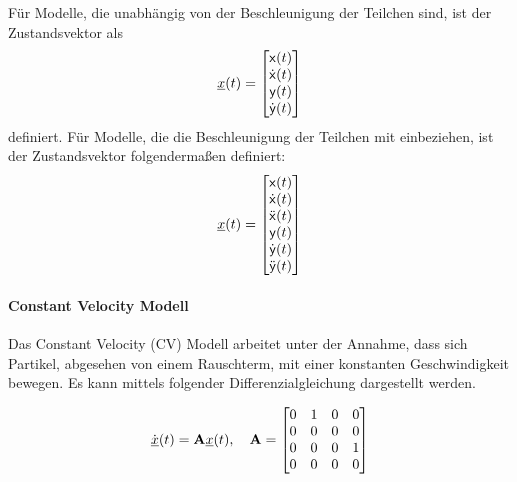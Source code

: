 Für Modelle, die unabhängig von der Beschleunigung der Teilchen sind, ist der Zustandsvektor als 
% 
\begin{equation} \label{eq:definitionCV}
    {\underline{x}}(t) = 
    \begin{bmatrix}
        \mathsf{x}(t) \\
        \dot{\mathsf{x}}(t) \\
        \mathsf{y}(t) \\
        \dot{\mathsf{y}}(t)
       \end{bmatrix} 
\end{equation}
% 
definiert.
Für Modelle, die die Beschleunigung der Teilchen mit einbeziehen, ist der Zustandsvektor folgendermaßen definiert:
% 
\begin{equation} \label{eq:definitionCA}
    {\underline{x}}(t) = 
    \begin{bmatrix}
        \mathsf{x}(t) \\
        \dot{\mathsf{x}}(t) \\
        \ddot{\mathsf{x}}(t) \\
        \mathsf{y}(t) \\
        \dot{\mathsf{y}}(t) \\
        \ddot{\mathsf{y}}(t)
       \end{bmatrix} 
\end{equation}
% 

\paragraph{Constant Velocity Modell}

Das Constant Velocity (CV) Modell arbeitet unter der Annahme, dass sich Partikel, 
abgesehen von einem Rauschterm, mit einer konstanten Geschwindigkeit bewegen.
Es kann mittels folgender Differenzialgleichung dargestellt werden.

\begin{equation*} \label{eq:speedCV}
    \dot{{\underline{x}}}(t) = {{\mathbf{A}}}{\underline{x}}(t), \quad {\ensuremath{{\mathbf{A}}}} = 
    \begin{bmatrix}
        0 & 1 & 0 & 0 \\
        0 & 0 & 0 & 0 \\
        0 & 0 & 0 & 1\\
        0 & 0 & 0 & 0
    \end{bmatrix} 
\end{equation*}

